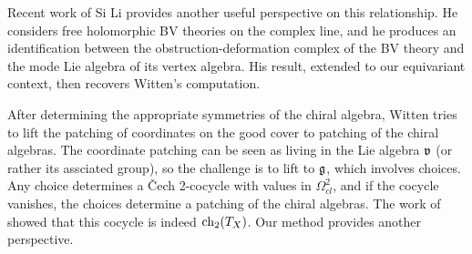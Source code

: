 \begin{rmk}
Recent work of Si Li \cite{LiQME} provides another useful perspective on this relationship.
He considers free holomorphic BV theories on the complex line,
and he produces an identification between the obstruction-deformation complex of the BV theory and the mode Lie algebra of its vertex algebra.
His result, extended to our equivariant context, then recovers Witten's computation. 
\end{rmk}

After determining the appropriate symmetries of the chiral algebra, 
Witten tries to lift the patching of coordinates on the good cover to patching of the chiral algebras.
The coordinate patching can be seen as living in the Lie algebra $\frak{v}$ (or rather its assciated group),
so the challenge is to lift to $\mathfrak g$, which involves choices.
Any choice determines a \v{C}ech 2-cocycle with values in $\Omega^2_{cl}$,
and if the cocycle vanishes,
the choices determine a patching of the chiral algebras.
The work of \cite{GMS} showed that this cocycle is indeed ${\rm ch}_2(T_X)$.
Our method provides another perspective.

